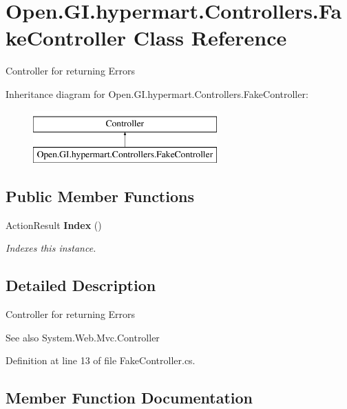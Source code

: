 \section{Open.\+G\+I.\+hypermart.\+Controllers.\+Fake\+Controller Class Reference}
\label{class_open_1_1_g_i_1_1hypermart_1_1_controllers_1_1_fake_controller}


Controller for returning Errors  


Inheritance diagram for Open.\+G\+I.\+hypermart.\+Controllers.\+Fake\+Controller\+:\begin{figure}[H]
\begin{center}
\leavevmode
\includegraphics[height=2.000000cm]{class_open_1_1_g_i_1_1hypermart_1_1_controllers_1_1_fake_controller}
\end{center}
\end{figure}
\subsection*{Public Member Functions}
\begin{DoxyCompactItemize}
\item 
Action\+Result \textbf{ Index} ()
\begin{DoxyCompactList}\small\item\em Indexes this instance. \end{DoxyCompactList}\end{DoxyCompactItemize}


\subsection{Detailed Description}
Controller for returning Errors 

\begin{DoxySeeAlso}{See also}
System.\+Web.\+Mvc.\+Controller


\end{DoxySeeAlso}


Definition at line 13 of file Fake\+Controller.\+cs.



\subsection{Member Function Documentation}
\mbox{\label{class_open_1_1_g_i_1_1hypermart_1_1_controllers_1_1_fake_controller_a783fcc0fd5e686066951dc93380d02bd}} 
